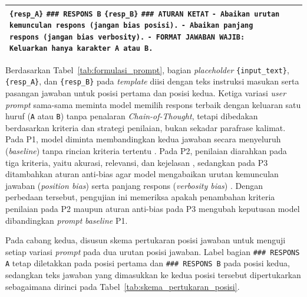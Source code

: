 \begin{enumerate}
\begin{table}[H]
\begin{minipage}{\dimexpr\textwidth-\leftmargini\relax}
{\begin{tabular}{|>{\raggedright\arraybackslash}p{2.35cm}|>{\raggedright\arraybackslash}p{2.25cm}|>{\raggedright\arraybackslash}p{7.24cm}|}
    \texttt{\{resp\_A\}}\vspace{2.5pt}\newline
    \texttt{\#\#\# RESPONS B}\newline
    \texttt{\{resp\_B\}}\vspace{2.5pt}\newline
    \texttt{\#\#\# ATURAN KETAT}\newline
    \texttt{- Abaikan urutan kemunculan respons (jangan bias posisi).}\newline
    \texttt{- Abaikan panjang respons (jangan bias verbosity).}\newline
    \texttt{- FORMAT JAWABAN WAJIB: Keluarkan hanya karakter A atau B.} \\
    \hline
  \end{tabular}
  }
  \end{minipage}
\end{table}

  Berdasarkan Tabel~\ref{tab:formulasi_prompt}, bagian \textit{placeholder} \texttt{\{input\_text\}}, \texttt{\{resp\_A\}}, dan \texttt{\{resp\_B\}} pada \textit{template} diisi dengan teks instruksi masukan serta pasangan jawaban untuk posisi pertama dan posisi kedua. Ketiga variasi \textit{user prompt} sama-sama meminta model memilih respons terbaik dengan keluaran satu huruf (\texttt{A} atau \texttt{B}) tanpa penalaran \textit{Chain-of-Thought}, tetapi dibedakan berdasarkan kriteria dan strategi penilaian, bukan sekadar parafrase kalimat. Pada P1, model diminta membandingkan kedua jawaban secara menyeluruh (\textit{baseline}) tanpa rincian kriteria tertentu \cite{zhengJudgingLLMasaJudgeMTBench2023}. Pada P2, penilaian diarahkan pada tiga kriteria, yaitu akurasi, relevansi, dan kejelasan \cite{guSurveyLLMasaJudge2025}\cite{liLLMsasJudgesComprehensiveSurvey2024}, sedangkan pada P3 ditambahkan aturan anti-bias agar model mengabaikan urutan kemunculan jawaban (\textit{position bias}) serta panjang respons (\textit{verbosity bias}) \cite{zhengJudgingLLMasaJudgeMTBench2023}\cite{anghelDiagnosingBiasInstability2025}. Dengan perbedaan tersebut, pengujian ini memeriksa apakah penambahan kriteria penilaian pada P2 maupun aturan anti-bias pada P3 mengubah keputusan model dibandingkan \textit{prompt} \textit{baseline} P1.

  Pada cabang kedua, disusun skema pertukaran posisi jawaban untuk menguji setiap variasi \textit{prompt} pada dua urutan posisi jawaban. Label bagian \texttt{\#\#\# RESPONS A} tetap diletakkan pada posisi pertama dan \texttt{\#\#\# RESPONS B} pada posisi kedua, sedangkan teks jawaban yang dimasukkan ke kedua posisi tersebut dipertukarkan sebagaimana dirinci pada Tabel~\ref{tab:skema_pertukaran_posisi}.


\end{enumerate}
